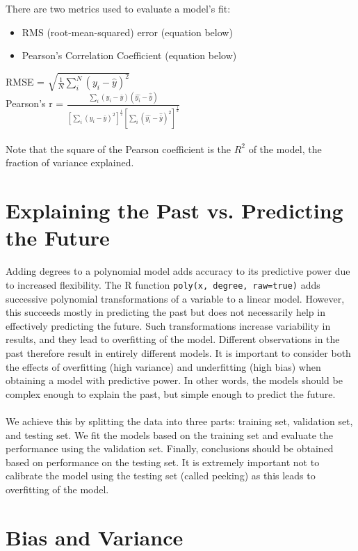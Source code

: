 There are two metrics used to evaluate a model's fit:
\begin{itemize}
\item RMS (root-mean-squared) error (equation below)
\item Pearson's Correlation Coefficient (equation below)
\end{itemize}

RMSE = $\sqrt{\frac{1}{N}\sum_{i}^{N}(y_i-\hat{y})^2}$ \\ 
Pearson's r = $\frac{\sum_i(y_i-\bar{y})(\hat{y_i}-\hat{\bar{y}})}{[\sum_i(y_i-\bar{y})^2]^\frac{1}{2}[\sum_i(\hat{y_i}-\hat{\bar{y}})^2]^\frac{1}{2}}$ \\ \\ 

Note that the square of the Pearson coefficient is the $R^2$ of the model, the fraction of variance explained. 

\section{Explaining the Past vs. Predicting the Future}

Adding degrees to a polynomial model adds accuracy to its predictive power due to increased flexibility. The R function \texttt{poly(x,\ degree,\ raw=true)} adds successive polynomial transformations of a variable to a linear model. However, this succeeds mostly in predicting the past but does not necessarily help in effectively predicting the future. Such transformations increase variability in results, and they lead to overfitting of the model. Different observations in the past therefore result in entirely different models. It is important to consider both the effects of overfitting (high variance) and underfitting (high bias) when obtaining a model with predictive power. In other words, the models should be complex enough to explain the past, but simple enough to predict the future. \\ \\ 
We achieve this by splitting the data into three parts: training set, validation set, and testing set. We fit the models based on the training set and evaluate the performance using the validation set. Finally, conclusions should be obtained based on performance on the testing set. It is extremely important not to calibrate the model using the testing set (called peeking) as this leads to overfitting of the model. 

\section{Bias and Variance}

